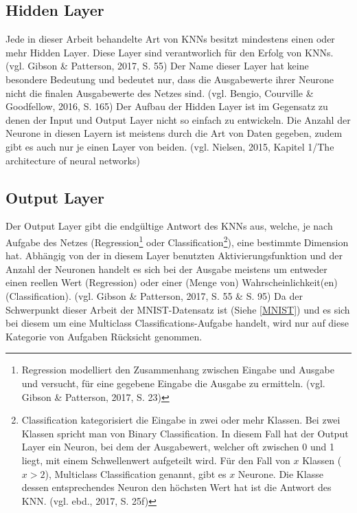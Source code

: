\documentclass[a4paper,12pt,ngerman,oneside]{scrreprt}	%
\begin{document}
			\subsection{Hidden Layer}
			Jede in dieser Arbeit behandelte Art von KNNs besitzt mindestens einen oder mehr Hidden Layer. Diese Layer sind verantworlich für den Erfolg von KNNs. (vgl. Gibson \& Patterson, 2017, S. 55) Der Name dieser Layer hat keine besondere Bedeutung und bedeutet nur, dass die Ausgabewerte ihrer Neurone nicht die finalen Ausgabewerte des Netzes sind. (vgl. Bengio, Courville \& Goodfellow, 2016, S. 165) Der Aufbau der Hidden Layer ist im Gegensatz zu denen der Input und Output Layer nicht so einfach zu entwickeln. Die Anzahl der Neurone in diesen Layern ist meistens durch die Art von Daten gegeben, zudem gibt es auch nur je einen Layer von beiden. (vgl. Nielsen, 2015, Kapitel 1/The architecture of neural networks)
			
			\subsection{Output Layer}\label{OutputLayer}
			Der Output Layer gibt die endgültige Antwort des KNNs aus, welche, je nach Aufgabe des Netzes (Regression\footnote{Regression modelliert den Zusammenhang zwischen Eingabe und Ausgabe und versucht, für eine gegebene Eingabe die Ausgabe zu ermitteln. (vgl. Gibson \& Patterson, 2017, S. 23)} oder Classification\footnote{Classification kategorisiert die Eingabe in zwei oder mehr Klassen. Bei zwei Klassen spricht man von Binary Classification. In diesem Fall hat der Output Layer ein Neuron, bei dem der Ausgabewert, welcher oft zwischen 0 und 1 liegt, mit einem Schwellenwert aufgeteilt wird. Für den Fall von $x$ Klassen ($x > 2$), Multiclass Classification genannt, gibt es $x$ Neurone. Die Klasse dessen entsprechendes Neuron den höchsten Wert hat ist die Antwort des KNN. (vgl. ebd., 2017, S. 25f)}), eine bestimmte Dimension hat. Abhängig von der in diesem Layer benutzten Aktivierungsfunktion und der Anzahl der Neuronen handelt es sich bei der Ausgabe meistens um entweder einen reellen Wert (Regression) oder einer (Menge von) Wahrscheinlichkeit(en) (Classification).  (vgl. Gibson \& Patterson, 2017, S. 55 \& S. 95) Da der Schwerpunkt dieser Arbeit der MNIST-Datensatz ist (Siehe \ref{MNIST}) und es sich bei diesem um eine Multiclass Classifications-Aufgabe handelt, wird nur auf diese Kategorie von Aufgaben Rücksicht genommen. 
	
\end{document}
